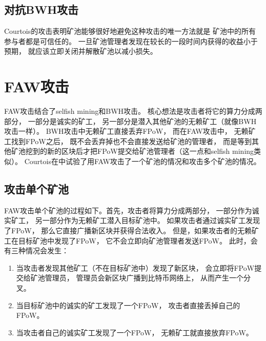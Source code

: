 \documentclass[a4paper, 11pt]{article}
\begin{document}
\begin{CJK*}{UTF8}{gbsn}
\begin{enumerate}
    \end{enumerate}

    \subsection{对抗BWH攻击}

    \indent

    Courtois的攻击表明矿池能够很好地避免这种攻击的唯一方法就是
    矿池中的所有参与者都是可信任的。
    一旦矿池管理者发现在较长的一段时间内获得的收益小于预期，
    就应该立即关闭并解散矿池以减小损失。


    \section{FAW攻击}

    \indent

    FAW攻击\cite{ref_FAW}结合了selfish mining和BWH攻击。
    核心想法是攻击者将它的算力分成两部分，
    一部分是诚实的矿工，
    另一部分是潜入其他矿池的无赖矿工（就像BWH攻击一样）。
    BWH攻击中无赖矿工直接丢弃FPoW，
    而在FAW攻击中，
    无赖矿工找到FPoW之后，
    既不会丢弃掉也不会直接发送给矿池的管理者，
    而是等到其他矿池挖到的新的区块后才把FPoW提交给矿池管理者（这一点和selfish mining类似）。
    Courtois在\cite{ref_FAW}中试验了用FAW攻击了一个矿池的情况和攻击多个矿池的情况。

    \subsection{攻击单个矿池}

    \indent

    FAW攻击单个矿池的过程如下。首先，攻击者将算力分成两部分，
    一部分作为诚实矿工，
    另一部分作为无赖矿工潜入目标矿池中。
    如果攻击者通过诚实矿工发现了FPoW，
    那么它直接广播新区块并获得合法收入。
    但是，如果攻击者的无赖矿工在目标矿池中发现了FPoW，
    它不会立即向矿池管理者发送FPoW。
    此时，会有三种情况会发生：

    \begin{enumerate}
        \item 当攻击者发现其他矿工（不在目标矿池中）发现了新区块，
        会立即将FPoW提交给矿池管理员，
        管理员会新区块广播到比特币网络上，
        从而产生一个分叉。
        \item 当目标矿池中的诚实的矿工发现了一个FPoW，
        攻击者直接丢掉自己的FPoW。
        \item 当攻击者自己的诚实矿工发现了一个FPoW，
        无赖矿工就直接放弃FPoW。
    \end{enumerate}


\end{CJK*}
\end{document}
